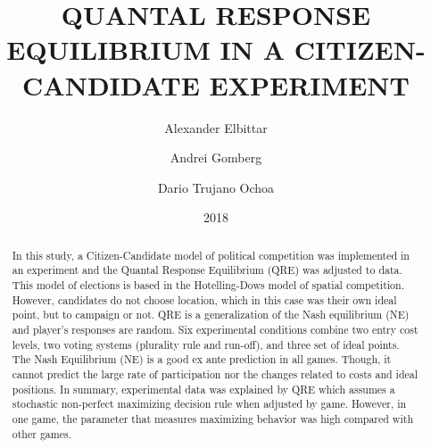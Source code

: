 \documentclass[12pts]{article}
\title{QUANTAL RESPONSE EQUILIBRIUM IN A CITIZEN-CANDIDATE EXPERIMENT}
\author{Alexander Elbittar \and Andrei Gomberg \and Dario Trujano Ochoa}
\date{2018}
\begin{document}
\maketitle

\begin{abstract}

In this study, a Citizen-Candidate model of political competition was implemented in an experiment and the Quantal Response Equilibrium (QRE) was adjusted to data. 
This model of elections is based in the Hotelling-Dows model of spatial competition. 
However, candidates do not choose location, which in this case was their own ideal point, but to campaign or not. QRE is a generalization of the Nash equilibrium (NE) and player's responses are random. Six experimental conditions combine two entry cost levels, 
two voting systems (plurality rule and run-off), and three set of ideal points. 
The Nash Equilibrium (NE) is a good ex ante prediction in all games. 
Though, it cannot predict the large rate of participation nor the changes related to costs and ideal positions.  
In summary,  experimental  data  was explained  by QRE which assumes  a  stochastic  non-perfect  maximizing  decision rule when adjusted by game. However, in one game, the parameter that measures maximizing behavior was high compared with other games.


\end{abstract}









 


\end{document}

